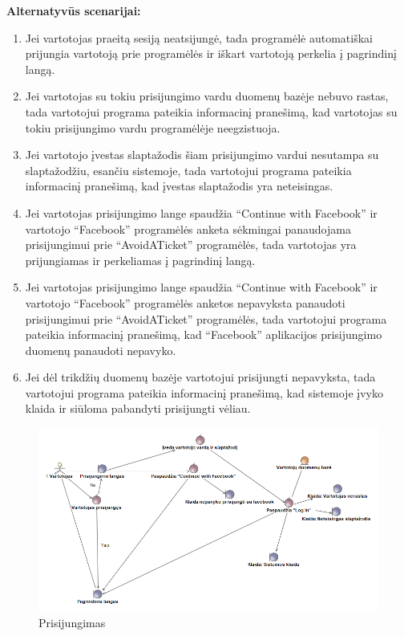\documentclass{VUMIFPSkursinis}
\begin{document}
	\textbf{Alternatyvūs scenarijai:}
	\begin{enumerate}[itemsep=-2mm]
		\item Jei vartotojas praeitą sesiją neatsijungė, tada programėlė automatiškai prijungia vartotoją prie programėlės ir iškart vartotoją perkelia į pagrindinį langą.
		\item Jei vartotojas su tokiu prisijungimo vardu duomenų bazėje nebuvo rastas, tada vartotojui programa pateikia informacinį pranešimą, kad vartotojas su tokiu prisijungimo vardu programėlėje neegzistuoja.
		\item Jei vartotojo įvestas slaptažodis šiam prisijungimo vardui nesutampa su slaptažodžiu, esančiu sistemoje, tada vartotojui programa pateikia informacinį pranešimą, kad įvestas slaptažodis yra neteisingas.
		\item Jei vartotojas prisijungimo lange spaudžia “Continue with Facebook” ir vartotojo “Facebook” programėlės anketa sėkmingai panaudojama prisijungimui prie “AvoidATicket” programėlės, tada vartotojas yra prijungiamas ir perkeliamas į pagrindinį langą.
		\item Jei vartotojas prisijungimo lange spaudžia “Continue with Facebook” ir vartotojo “Facebook” programėlės anketos nepavyksta panaudoti prisijungimui prie “AvoidATicket” programėlės, tada vartotojui programa pateikia informacinį pranešimą, kad “Facebook” aplikacijos prisijungimo duomenų panaudoti nepavyko.
		\item Jei dėl trikdžių duomenų bazėje vartotojui prisijungti nepavyksta, tada vartotojui programa pateikia informacinį pranešimą, kad sistemoje įvyko klaida ir siūloma pabandyti prisijungti vėliau.
	\end{enumerate} 
	\begin{figure}[H]
				\centering
				\includegraphics[scale=0.5]{img/Robustness_Prisijungimas}
				\caption{Prisijungimas}
				\label{img:Prisijungimo robustiškumo diagrama}
			\end{figure}	
\end{document}
